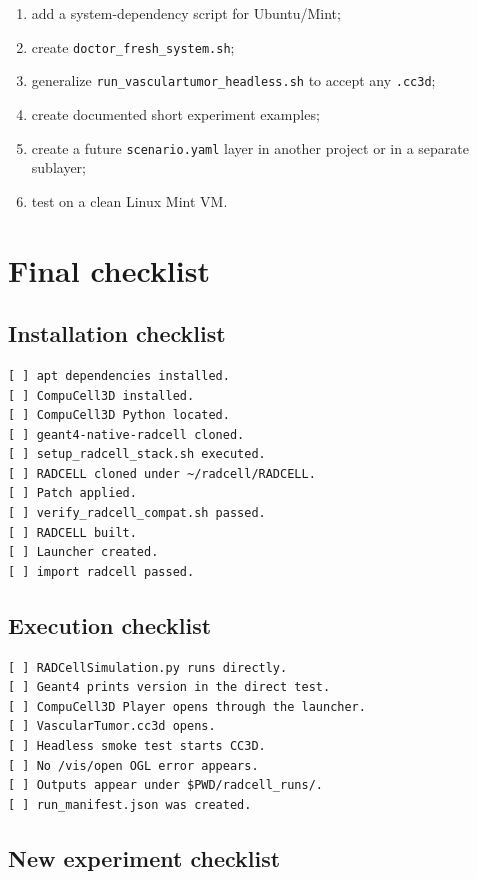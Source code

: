 \documentclass[11pt,a4paper,twoside,pdftex]{refrep}
\begin{document}
\begin{enumerate}
  \item add a system-dependency script for Ubuntu/Mint;
  \item create \texttt{doctor\_fresh\_system.sh};
  \item generalize \texttt{run\_vasculartumor\_headless.sh} to accept any \texttt{.cc3d};
  \item create documented short experiment examples;
  \item create a future \texttt{scenario.yaml} layer in another project or in a separate sublayer;
  \item test on a clean Linux Mint VM.
\end{enumerate}

\chapter{Final checklist}

\section{Installation checklist}

\begin{lstlisting}
[ ] apt dependencies installed.
[ ] CompuCell3D installed.
[ ] CompuCell3D Python located.
[ ] geant4-native-radcell cloned.
[ ] setup_radcell_stack.sh executed.
[ ] RADCELL cloned under ~/radcell/RADCELL.
[ ] Patch applied.
[ ] verify_radcell_compat.sh passed.
[ ] RADCELL built.
[ ] Launcher created.
[ ] import radcell passed.
\end{lstlisting}

\section{Execution checklist}

\begin{lstlisting}
[ ] RADCellSimulation.py runs directly.
[ ] Geant4 prints version in the direct test.
[ ] CompuCell3D Player opens through the launcher.
[ ] VascularTumor.cc3d opens.
[ ] Headless smoke test starts CC3D.
[ ] No /vis/open OGL error appears.
[ ] Outputs appear under $PWD/radcell_runs/.
[ ] run_manifest.json was created.
\end{lstlisting}

\section{New experiment checklist}
\end{document}
